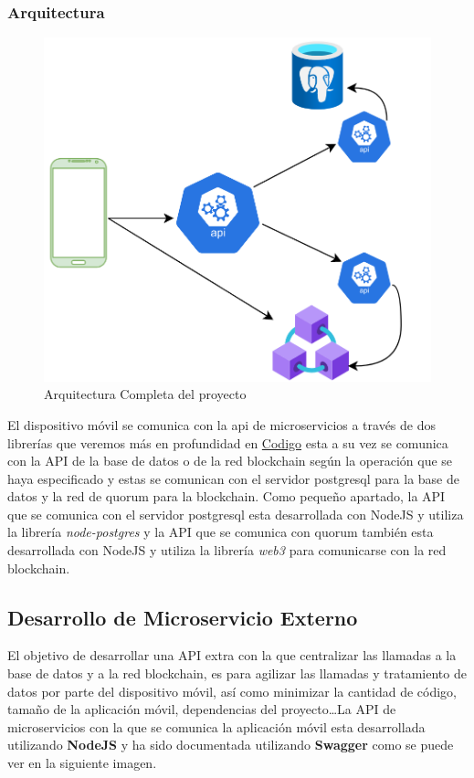 \subsubsection{Arquitectura}
\begin{figure}[h!]
  \centering
  \includegraphics[width=0.6\linewidth]{figs/Desarrollo/Arquitectura}
  \caption[Arquitectura]{Arquitectura Completa del proyecto}
  \label{fig:estublockArch}
\end{figure}

El dispositivo móvil se comunica con la api de microservicios a través de dos librerías que veremos más en profundidad en \hyperref[sec:Codigo]{Codigo} esta a su vez se comunica con la API de la base de datos o de la red blockchain según la operación que se haya especificado y estas se comunican con el servidor postgresql para la base de datos y la red de quorum para la blockchain. Como pequeño apartado, la API que se comunica con el servidor postgresql esta desarrollada con NodeJS y utiliza la librería \emph{node-postgres} y la API que se comunica con quorum también esta desarrollada con NodeJS y utiliza la librería \emph{web3} para comunicarse con la red blockchain. 

\subsection{Desarrollo de Microservicio Externo}

El objetivo de desarrollar una API extra con la que centralizar las llamadas a la base de datos y a la red blockchain, es para agilizar las llamadas y tratamiento de datos por parte del dispositivo móvil, así como minimizar la cantidad de código, tamaño de la aplicación móvil, dependencias del proyecto\dots La API de microservicios con la que se comunica la aplicación móvil esta desarrollada utilizando \textbf{NodeJS} y ha sido documentada utilizando \textbf{Swagger} como se puede ver en la siguiente imagen.

